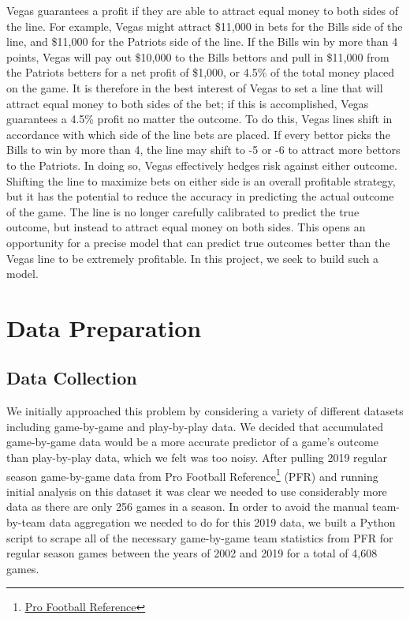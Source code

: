 \documentclass{article}
\begin{document}
\begin{multicols}{2}
Vegas guarantees a profit if they are able to attract equal money to both sides of the line. For example, Vegas might attract \$11,000 in bets for the Bills side of the line, and \$11,000 for the Patriots side of the line. If the Bills win by more than 4 points, Vegas will pay out \$10,000 to the Bills bettors and pull in \$11,000 from the Patriots betters for a net profit of \$1,000, or 4.5\% of the total money placed on the game. It is therefore in the best interest of Vegas to set a line that will attract equal money to both sides of the bet; if this is accomplished, Vegas guarantees a 4.5\% profit no matter the outcome. To do this, Vegas lines shift in accordance with which side of the line bets are placed. If every bettor picks the Bills to win by more than 4, the line may shift to -5 or -6 to attract more bettors to the Patriots. In doing so, Vegas effectively hedges risk against either outcome. Shifting the line to maximize bets on either side is an overall profitable strategy, but it has the potential to reduce the accuracy in predicting the actual outcome of the game. The line is no longer carefully calibrated to predict the true outcome, but instead to attract equal money on both sides. This opens an opportunity for a precise model that can predict true outcomes better than the Vegas line to be extremely profitable. In this project, we seek to build such a model.

\section{Data Preparation}
\subsection{Data Collection}
We initially approached this problem by considering a variety of different datasets including game-by-game and play-by-play data. We decided that accumulated game-by-game data would be a more accurate predictor of a game’s outcome than play-by-play data, which we felt was too noisy. After pulling 2019 regular season game-by-game data from Pro Football Reference\footnote{\href{https://www.pro-football-reference.com/teams/buf/2019.htm}{\underline{Pro Football Reference}} } (PFR) and running initial analysis on this dataset it was clear we needed to use considerably more data as there are only 256 games in a season. In order to avoid the manual team-by-team data aggregation we needed to do for this 2019 data, we built a Python script to scrape all of the necessary game-by-game team statistics from PFR for regular season games between the years of 2002 and 2019 for a total of 4,608 games.


\end{multicols}
\end{document}
